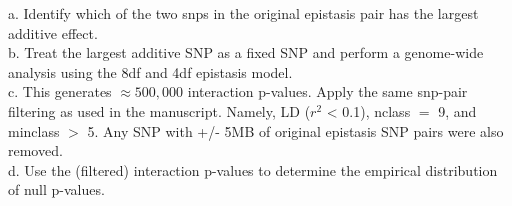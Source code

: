 \documentclass[paper=a4, fontsize=11pt]{scrartcl}         %
\numberwithin{equation}{section}                  %
\numberwithin{figure}{section}                    %
\numberwithin{table}{section}                   %
\begin{document}
a. Identify which of the two snps in the original epistasis pair has the largest additive effect. \\

b. Treat the largest additive SNP as a fixed SNP and perform a genome-wide analysis using the 8df and 4df epistasis model. \\

c. This generates $\approx 500,000$ interaction p-values. Apply the same snp-pair filtering as used in the manuscript. Namely, LD ($r^2$ < 0.1), nclass $=$ 9, and minclass $>$ 5. Any SNP with +/- 5MB of original epistasis SNP pairs were also removed. \\

d.  Use the (filtered) interaction p-values to determine the empirical distribution of null p-values. \\

\newpage
\end{document}
